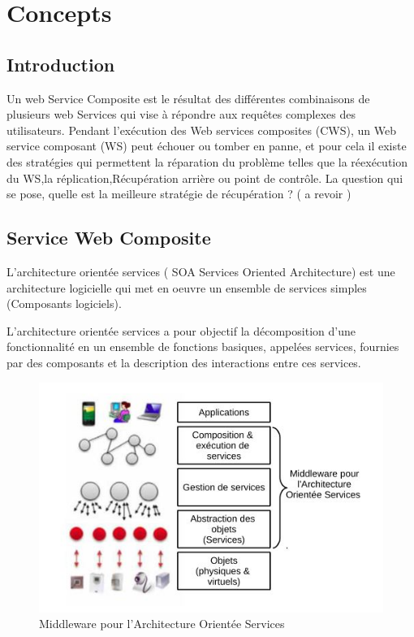 
\chapter{Concepts}

\section{Introduction}

Un web Service Composite est  le résultat des différentes combinaisons de plusieurs web Services qui vise à répondre aux requêtes complexes des utilisateurs.
Pendant l'exécution des Web services composites (CWS), un Web service composant (WS) peut échouer ou tomber en panne, et pour cela il existe des stratégies qui permettent la réparation du problème telles que  la réexécution du WS,la réplication,Récupération arrière ou point de contrôle.
La question qui se pose, quelle est la meilleure stratégie de récupération ? 
( a revoir ) 

\section{Service Web Composite}

L'architecture orientée services ( SOA Services Oriented Architecture) est une architecture logicielle qui met en oeuvre un ensemble de services simples (Composants logiciels).

L'architecture orientée services a pour objectif la décomposition d'une fonctionnalité en un ensemble de fonctions basiques, appelées services, fournies par des composants et la description des interactions entre ces services.


\begin{figure}[H]
\begin{center}
\includegraphics[width=1\linewidth]{images/Middleware SOA.jpg}
\end{center}
\caption{Middleware pour l’Architecture Orientée Services}
\label{fig:1}
\end{figure}

